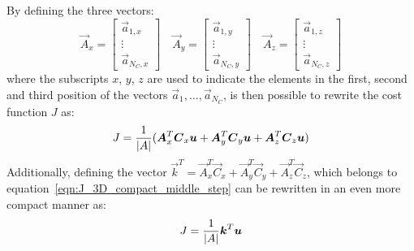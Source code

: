 By defining the three vectors:
\begin{equation}
	\vec{A}_x =
	\begin{bmatrix}
		\vec{a}_{1,x}   \\
		\vdots			\\
		\vec{a}_{N_C,x}
	\end{bmatrix} \quad
	\vec{A}_y =
	\begin{bmatrix}
		\vec{a}_{1,y}   \\
		\vdots			\\
		\vec{a}_{N_C,y}
	\end{bmatrix} \quad
	\vec{A}_z =
	\begin{bmatrix}
		\vec{a}_{1,z}   \\
		\vdots			\\
		\vec{a}_{N_C,z}
	\end{bmatrix}
\end{equation}
where the subscripts $x$, $y$, $z$ are used to indicate the elements in the first, second and third position of the vectors $\vec{a}_1, \dots, \vec{a}_{N_C}$, is then possible to rewrite the cost function $J$ as:
\begin{equation}
	\label{eqn:J_3D_compact_middle_step}
	J = \frac{1}{\lvert A\rvert} ( \boldsymbol{A}_x^T \boldsymbol{C}_x \boldsymbol{u} + \boldsymbol{A}_y^T \boldsymbol{C}_y \boldsymbol{u} + \boldsymbol{A}_z^T \boldsymbol{C}_z \boldsymbol{u})
\end{equation}
Additionally, defining the vector $\vec{k}^T = \vec{A}_x^T \vec{C}_x + \vec{A}_y^T \vec{C}_y + \vec{A}_z^T \vec{C}_z$, which belongs to equation~\eqref{eqn:J_3D_compact_middle_step} can be rewritten in an even more compact manner as:
\begin{equation}
	\label{eqn:J_3D_compact}
	J = \frac{1}{\lvert A\rvert} \boldsymbol{k}^T \boldsymbol{u}
\end{equation}

